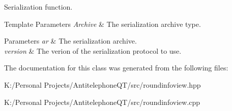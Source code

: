 Serialization function. 


\begin{DoxyTemplParams}{Template Parameters}
{\em Archive} & The serialization archive type. \\
\hline
\end{DoxyTemplParams}

\begin{DoxyParams}{Parameters}
{\em ar} & The serialization archive. \\
\hline
{\em version} & The verion of the serialization protocol to use. \\
\hline
\end{DoxyParams}


The documentation for this class was generated from the following files\+:\begin{DoxyCompactItemize}
\item 
K\+:/\+Personal Projects/\+Antitelephone\+Q\+T/src/roundinfoview.\+hpp\item 
K\+:/\+Personal Projects/\+Antitelephone\+Q\+T/src/roundinfoview.\+cpp\end{DoxyCompactItemize}
